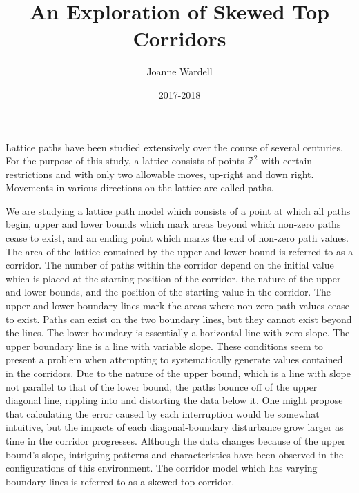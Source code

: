 \documentclass{article}
\title{An Exploration of Skewed Top Corridors\vspace{-2ex}}
\author{Joanne Wardell}
\date{2017-2018\vspace{-2ex}}
\newcommand\tab[1][1cm]{\hspace*{#1}}
\newcommand*{\set}[1]{\mathbb{#1}}
\theoremstyle{definition}
\begin{document}
  
  \maketitle

  \tab Lattice paths have been studied extensively over the course of several centuries. For the purpose of this study, 
  a lattice consists of points $\set{Z}^2$ with certain restrictions and with only two allowable moves, up-right 
  and down right. Movements in various directions on the lattice are called paths.\par
  
  \tab We are studying a lattice path model which consists of a point at which all paths begin, upper and lower bounds 
  which mark areas beyond which non-zero paths cease to exist, and an ending point which marks the end of non-zero path  
  values. The area of the lattice contained by the upper and lower bound is referred to as a corridor.  The number of  
  paths within the corridor depend on the initial value which is placed at the starting position of the corridor, the 
  nature of the upper and lower bounds, and the position of the starting value in the corridor. The upper and lower 
  boundary lines mark the areas where non-zero path values cease to exist. Paths can exist on the two boundary lines,  
  but they cannot exist beyond the lines. The lower boundary is essentially a horizontal line with zero slope. The upper 
  boundary line is a line with variable slope. These conditions seem to present a problem when attempting to 
  systematically generate values contained in the corridors. Due to the nature of the upper bound, which is a line 
  with slope not parallel to that of the lower bound, the paths bounce off of the upper diagonal line, rippling into 
  and distorting the data below it. One might propose that calculating the error caused by each interruption would be 
  somewhat intuitive, but the impacts of each diagonal-boundary disturbance grow larger as time in the corridor 
  progresses. Although the data changes because of the upper bound's slope, intriguing patterns and characteristics 
  have been observed in the configurations of this environment. The corridor model which has varying boundary lines 
  is referred to as a skewed top corridor.\par
  
\end{document}
